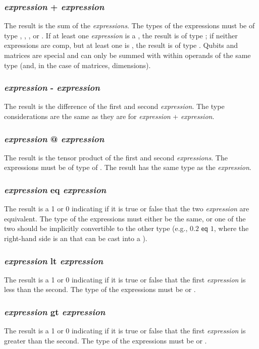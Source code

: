 \subsubsection{\textit{expression} + \textit{expression}}
The result is the sum of the \textit{expressions}. The types of the expressions must be of type \integ, \float, \complex, or \mat. If at least one \textit{expression} is a \complex, the result is of type \complex; if neither expressions are comp, but at least one is \float, the result is of type \float. Qubits and matrices are special and can only be summed with within operands of the same type (and, in the case of matrices, dimensions).
\subsubsection{\textit{expression} - \textit{expression}}
The result is the difference of the first and second \textit{expression}. The type considerations are the same as they are for \textit{expression} + \textit{expression}.
\subsubsection{\textit{expression} @ \textit{expression}}
The result is the tensor product of the first and second \textit{expressions}. The expressions must be of type of \mat. The result has the same type as the \textit{expression}.
\subsubsection{\textit{expression} eq \textit{expression}}
The result is a 1 or 0 indicating if it is true or false that the two \textit{expression} are equivalent. The type of the expressions must either be the same, or one of the two should be implicitly convertible to the other type (e.g., $0.2 \textsf{ eq } 1$, where the right-hand side is an \integ that can be cast into a \float).
\subsubsection{\textit{expression} lt \textit{expression}}
The result is a 1 or 0 indicating if it is true or false that the first \textit{expression} is less than the second. The type of the expressions must be \integ or \float.%
\subsubsection{\textit{expression} gt \textit{expression}}
The result is a 1 or 0 indicating if it is true or false that the first \textit{expression} is greater than the second. The type of the expressions must be \integ or \float.%
